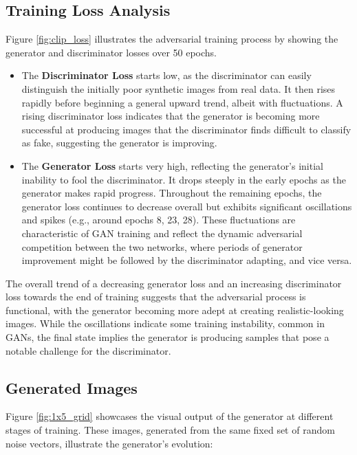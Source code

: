 \documentclass{article}
\begin{document}
\subsection*{Training Loss Analysis}
Figure \ref{fig:clip_loss} illustrates the adversarial training process by showing the generator and discriminator losses over 50 epochs.
\begin{itemize}
    \item The \textbf{Discriminator Loss} starts low, as the discriminator can easily distinguish the initially poor synthetic images from real data. It then rises rapidly before beginning a general upward trend, albeit with fluctuations. A rising discriminator loss indicates that the generator is becoming more successful at producing images that the discriminator finds difficult to classify as fake, suggesting the generator is improving.
    \item The \textbf{Generator Loss} starts very high, reflecting the generator's initial inability to fool the discriminator. It drops steeply in the early epochs as the generator makes rapid progress. Throughout the remaining epochs, the generator loss continues to decrease overall but exhibits significant oscillations and spikes (e.g., around epochs 8, 23, 28). These fluctuations are characteristic of GAN training and reflect the dynamic adversarial competition between the two networks, where periods of generator improvement might be followed by the discriminator adapting, and vice versa.
\end{itemize}
The overall trend of a decreasing generator loss and an increasing discriminator loss towards the end of training suggests that the adversarial process is functional, with the generator becoming more adept at creating realistic-looking images. While the oscillations indicate some training instability, common in GANs, the final state implies the generator is producing samples that pose a notable challenge for the discriminator.

\subsection*{Generated Images}

Figure \ref{fig:1x5_grid} showcases the visual output of the generator at different stages of training. These images, generated from the same fixed set of random noise vectors, illustrate the generator's evolution:
\end{document}
